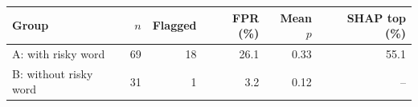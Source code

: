 \begin{tabular}{lrrrrr}
\toprule
Group & $n$ & Flagged & FPR (\%) & Mean $p$ & SHAP top (\%) \\
\midrule
A: with risky word & 69 & 18 & 26.1 & 0.33 & 55.1 \\
B: without risky word & 31 & 1 & 3.2 & 0.12 & -- \\
\bottomrule
\end{tabular}
